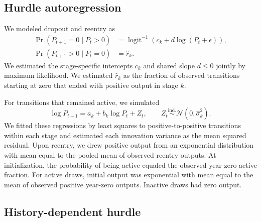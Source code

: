 \documentclass[9pt,twoside,lineno]{pnas-new}
\begin{document}
\subsection*{Hurdle autoregression}

We modeled dropout and reentry as
\begin{equation}
\begin{aligned}
\Pr(P_{t+1}=0\mid P_t>0)
&=\operatorname{logit}^{-1}\!\left(c_k+d\log(P_t+\epsilon)\right),\\
\Pr(P_{t+1}>0\mid P_t=0)&=\hat r_k.
\end{aligned}
\end{equation}
We estimated the stage-specific intercepts $c_k$ and shared slope
$d\leq0$ jointly by maximum likelihood. We estimated $\hat r_k$ as
the fraction of observed transitions starting at zero that ended
with positive output in stage $k$.

For transitions that remained active, we simulated
\begin{equation}
\log P_{t+1}=a_k+b_k\log P_t+Z_t,
\qquad
Z_t\overset{\mathrm{ind.}}{\sim}\mathcal{N}(0,\hat\sigma_k^2).
\end{equation}
We fitted these regressions by least squares to positive-to-positive
transitions within each stage and estimated each innovation variance
as the mean squared residual. Upon reentry, we drew positive output
from an exponential distribution with mean equal to the pooled mean
of observed reentry outputs. At initialization, the probability of
being active equaled the observed year-zero active fraction. For
active draws, initial output was exponential with mean equal to the
mean of observed positive year-zero outputs. Inactive draws had zero
output.

\subsection*{History-dependent hurdle}
\end{document}
